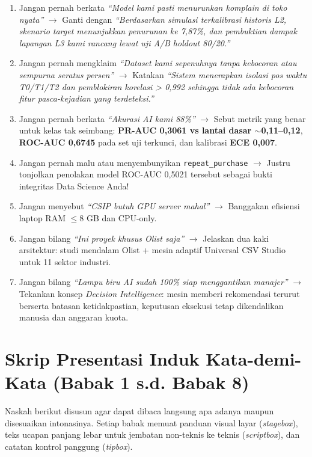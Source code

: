 \documentclass[11pt,a4paper,oneside]{book}
\newcommand{\code}[1]{{\small\nolinkurl{#1}}}
\begin{document}
\begin{tipbox}
\begin{enumerate}
  \item Jangan pernah berkata \emph{``Model kami pasti menurunkan komplain di toko nyata''} $\rightarrow$ Ganti dengan \emph{``Berdasarkan simulasi terkalibrasi historis L2, skenario target menunjukkan penurunan ke 7,87\%, dan pembuktian dampak lapangan L3 kami rancang lewat uji A/B holdout 80/20.''}
  \item Jangan pernah mengklaim \emph{``Dataset kami sepenuhnya tanpa kebocoran atau sempurna seratus persen''} $\rightarrow$ Katakan \emph{``Sistem menerapkan isolasi pos waktu T0/T1/T2 dan pemblokiran korelasi > 0,992 sehingga tidak ada kebocoran fitur pasca-kejadian yang terdeteksi.''}
  \item Jangan pernah berkata \emph{``Akurasi AI kami 88\%''} $\rightarrow$ Sebut metrik yang benar untuk kelas tak seimbang: \textbf{PR-AUC 0,3061 vs lantai dasar $\sim$0,11--0,12}, \textbf{ROC-AUC 0,6745} pada set uji terkunci, dan kalibrasi \textbf{ECE 0,007}.
  \item Jangan pernah malu atau menyembunyikan \code{repeat_purchase} $\rightarrow$ Justru tonjolkan penolakan model ROC-AUC 0,5021 tersebut sebagai bukti integritas Data Science Anda!
  \item Jangan menyebut \emph{``CSIP butuh GPU server mahal''} $\rightarrow$ Banggakan efisiensi laptop RAM $\le 8$ GB dan CPU-only.
  \item Jangan bilang \emph{``Ini proyek khusus Olist saja''} $\rightarrow$ Jelaskan dua kaki arsitektur: studi mendalam Olist + mesin adaptif Universal CSV Studio untuk 11 sektor industri.
  \item Jangan bilang \emph{``Lampu biru AI sudah 100\% siap menggantikan manajer''} $\rightarrow$ Tekankan konsep \emph{Decision Intelligence}: mesin memberi rekomendasi terurut berserta batasan ketidakpastian, keputusan eksekusi tetap dikendalikan manusia dan anggaran kuota.
\end{enumerate}
\end{tipbox}

\chapter{Skrip Presentasi Induk Kata-demi-Kata (Babak 1 s.d. Babak 8)}

Naskah berikut disusun agar dapat dibaca langsung apa adanya maupun disesuaikan intonasinya. Setiap babak memuat panduan visual layar (\emph{stagebox}), teks ucapan panjang lebar untuk jembatan non-teknis ke teknis (\emph{scriptbox}), dan catatan kontrol panggung (\emph{tipbox}).
\end{document}
